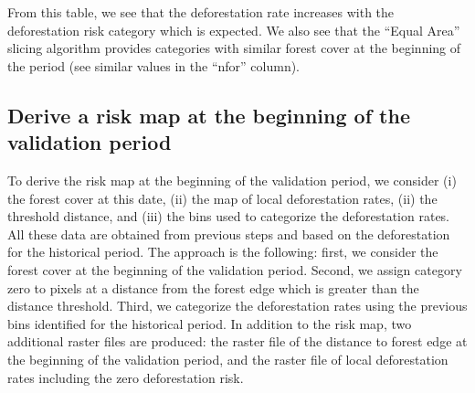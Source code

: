 \documentclass[paper=a4, 12pt, DIV=12]{scrartcl}
\begin{document}
From this table, we see that the deforestation rate increases with the deforestation risk category which is expected. We also see that the ``Equal Area'' slicing algorithm provides categories with similar forest cover at the beginning of the period (see similar values in the ``nfor'' column).

\subsection{Derive a risk map at the beginning of the validation period}
\label{sec:orga655438}

To derive the risk map at the beginning of the validation period, we consider (i) the forest cover at this date, (ii) the map of local deforestation rates, (ii) the threshold distance, and (iii) the bins used to categorize the deforestation rates. All these data are obtained from previous steps and based on the deforestation for the historical period. The approach is the following: first, we consider the forest cover at the beginning of the validation period. Second, we assign category zero to pixels at a distance from the forest edge which is greater than the distance threshold. Third, we categorize the deforestation rates using the previous bins identified for the historical period. In addition to the risk map, two additional raster files are produced: the raster file of the distance to forest edge at the beginning of the validation period, and the raster file of local deforestation rates including the zero deforestation risk.
\end{document}
